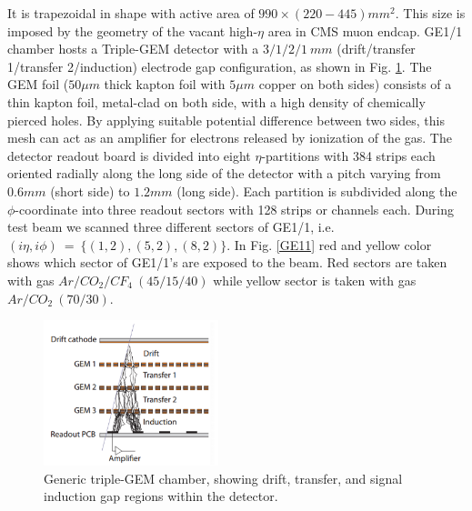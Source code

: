  It is trapezoidal in shape with active area of $990\times (220-445)mm^2$. This size is imposed by the geometry of the vacant high-$\eta$ area in CMS muon endcap. GE1/1 chamber hosts a Triple-GEM detector with a $3/1/2/1~mm$ (drift/transfer 1/transfer 2/induction) electrode gap configuration, as shown in Fig. \ref{GEM:cascade}. The GEM foil ($50\mu m$ thick kapton foil with $5\mu m$ copper on both sides) consists of a thin kapton foil, metal-clad on both side, with a high density of chemically pierced holes. By applying suitable potential difference between two sides, this mesh can act as an amplifier for electrons released by ionization of the gas. The detector readout board is divided into eight $\eta$-partitions with 384 strips each oriented radially along the long side of the detector with a pitch varying from $0.6mm$ (short side) to $1.2mm$ (long side). Each partition is subdivided along the $\phi$-coordinate into three readout sectors with 128 strips or channels each. During test beam we scanned three different sectors of GE1/1, i.e. $(i\eta,i\phi)~=~\{(1,2),(5,2),(8,2)\}$. In Fig. \ref{GE11} red and yellow color shows which sector of GE1/1's are exposed to the beam. Red sectors are taken with gas $Ar/CO_2/CF_4~(45/15/40) $ while yellow sector is taken with gas $Ar/CO_2~(70/30)$.

\begin{figure}[!htbp]
\centering
\includegraphics[width=2.0in]{figures/GEM/GEMCascade.png}
\caption{Generic triple-GEM chamber, showing drift, transfer, and signal induction gap regions within the detector.}
\label{GEM:cascade}
\end{figure}



